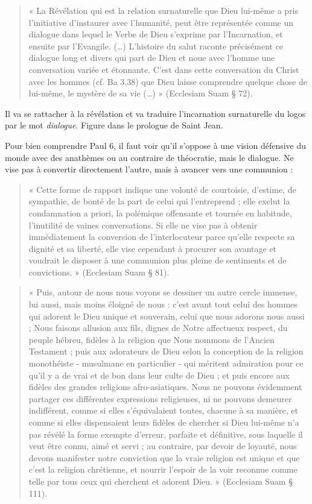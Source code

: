 \begin{quote}
    « La Révélation qui est la relation surnaturelle que Dieu lui-même a pris l’initiative d’instaurer avec l’humanité, peut être représentée comme un dialogue dans lequel le Verbe de Dieu s’exprime par l’Incarnation, et ensuite par l’Evangile. (…) L’histoire du salut raconte précisément ce dialogue long et divers qui part de Dieu et noue avec l’homme une conversation variée et étonnante. C’est dans cette conversation du Christ avec les hommes (cf. Ba 3,38) que Dieu laisse comprendre quelque chose de lui-même, le mystère de sa vie (…) » (Ecclesiam Suam § 72). 
\end{quote}
 Il va se rattacher à la révélation et va traduire l'incarnation surnaturelle du logos par le mot \textit{dialogue}. Figure dans le prologue de Saint Jean. 
 
 
 Pour bien comprendre Paul 6, il faut voir qu'il s'oppose à une vision défensive du monde avec des anathèmes ou au contraire de théocratie, mais le dialogue. 
 Ne vise pas à convertir directement l'autre, mais à avancer vers une communion : 
 
 \begin{quote}
     « Cette forme de rapport indique une volonté de courtoisie, d'estime, de sympathie, de bonté de la part de celui qui l'entreprend ; elle exclut la condamnation a priori, la polémique offensante et tournée en habitude, l'inutilité de vaines conversations. Si elle ne vise pas à obtenir immédiatement la conversion de l'interlocuteur parce qu'elle respecte sa dignité et sa liberté, elle vise cependant à procurer son avantage et voudrait le disposer à une communion plus pleine de sentiments et de convictions. » (Ecclesiam Suam § 81). 
 \end{quote}
   
   
   
   \begin{quote}
       « Puis, autour de nous nous voyons se dessiner un autre cercle immense, lui aussi, mais moins éloigné de nous : c'est avant tout celui des hommes qui adorent le Dieu unique et souverain, celui que nous adorons nous aussi ; Nous faisons allusion aux fils, dignes de Notre affectueux respect, du peuple hébreu, fidèles à la religion que Nous nommons de l'Ancien Testament ; puis aux adorateurs de Dieu selon la conception de la religion monothéiste - musulmane en particulier - qui méritent admiration pour ce qu'il y a de vrai et de bon dans leur culte de Dieu ; et puis encore aux fidèles des grandes religions afro-asiatiques. Nous ne pouvons évidemment partager ces différentes expressions religieuses, ni ne pouvons demeurer indifférent, comme si elles s'équivalaient toutes, chacune à sa manière, et comme si elles dispensaient leurs fidèles de chercher si Dieu lui-même n'a pas révélé la forme exempte d'erreur, parfaite et définitive, sous laquelle il veut être connu, aimé et servi ; au contraire, par devoir de loyauté, nous devons manifester notre conviction que la vraie religion est unique et que c'est la religion chrétienne, et nourrir l'espoir de la voir reconnue comme telle par tous ceux qui cherchent et adorent Dieu. » (Ecclesiam Suam § 111). 
   \end{quote}
   
